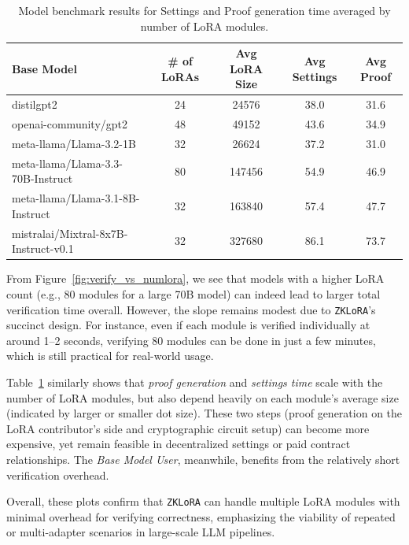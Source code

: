 \documentclass[11pt]{article}
\begin{document}
\begin{table}[h]
\centering
\begin{tabular}{lcccc}
\hline
Base Model & \# of LoRAs & Avg LoRA Size & Avg Settings & Avg Proof \\
\hline
distilgpt2 & 24 & 24576 & 38.0 & 31.6 \\
openai-community/gpt2 & 48 & 49152 & 43.6 & 34.9 \\
meta-llama/Llama-3.2-1B & 32 & 26624 & 37.2 & 31.0 \\
meta-llama/Llama-3.3-70B-Instruct & 80 & 147456 & 54.9 & 46.9 \\
meta-llama/Llama-3.1-8B-Instruct & 32 & 163840 & 57.4 & 47.7 \\
mistralai/Mixtral-8x7B-Instruct-v0.1 & 32 & 327680 & 86.1 & 73.7 \\
\hline
\end{tabular}
\caption{Model benchmark results for Settings and Proof generation time averaged by number of LoRA modules.}\label{tab:settings_proof}
\end{table}

From Figure~\ref{fig:verify_vs_numlora}, we see that models with a higher LoRA count (e.g., 80 modules for a large 70B model) can indeed lead to larger total verification time overall. However, the slope remains modest due to \texttt{ZKLoRA}’s succinct design. For instance, even if each module is verified individually at around 1--2 seconds, verifying 80 modules can be done in just a few minutes, which is still practical for real-world usage.

Table~\ref{tab:settings_proof} similarly shows that \emph{proof generation} and \emph{settings time} scale with the number of LoRA modules, but also depend heavily on each module’s average size (indicated by larger or smaller dot size). These two steps (proof generation on the LoRA contributor’s side and cryptographic circuit setup) can become more expensive, yet remain feasible in decentralized settings or paid contract relationships. The \emph{Base Model User}, meanwhile, benefits from the relatively short verification overhead.

Overall, these plots confirm that \texttt{ZKLoRA} can handle multiple LoRA modules with minimal overhead for verifying correctness, emphasizing the viability of repeated or multi-adapter scenarios in large-scale LLM pipelines.
\end{document}

